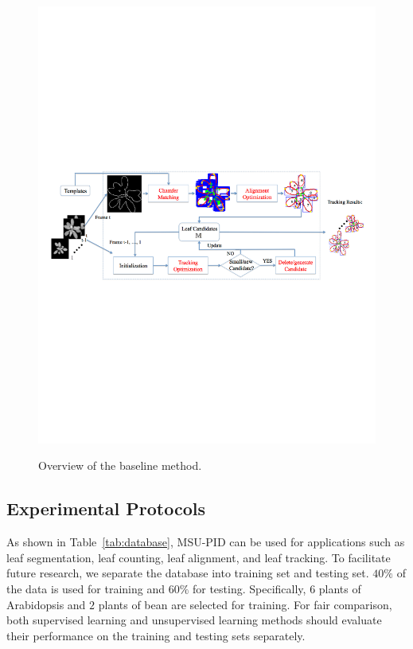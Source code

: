 \begin{figure}[t!]
\centering
\includegraphics[width=.98\textwidth]{Figures/overview}\\
\caption{Overview of the baseline method.}
\label{fig:methodOverview}
\end{figure}

\subsection{Experimental Protocols}
\label{sec:protocol}
As shown in Table~\ref{tab:database}, MSU-PID can be used for applications such as leaf segmentation, leaf counting, leaf alignment, and leaf tracking.
To facilitate future research, we separate the database into training set and testing set.
$40\%$ of the data is used for training and $60\%$ for testing.
Specifically, $6$ plants of Arabidopsis and $2$ plants of bean are selected for training.
For fair comparison, both supervised learning and unsupervised learning methods should evaluate their performance on the training and testing sets separately.

